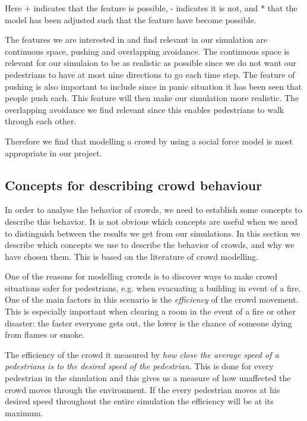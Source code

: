 Here + indicates that the feature is possible, - indicates it is not, and * that 
the model has been adjusted such that the feature have become possible. \cite{Comparison}

The features we are interested in and find relevant in our simulation are 
continuous space, pushing and overlapping avoidance. The continuous space is 
relevant for our simulaion to be as realistic as possible since we do not want 
our pedestrians to have at most nine directions to go each time step.
The feature of pushing is also important to include since in panic situation it 
has been seen that people push each. This feature will then make our simulation 
more realistic. The overlapping avoidance we find relevant since this enables 
pedestrians to walk through each other.

Therefore we find that modelling a crowd by using a social force model is most 
appropriate in our project. 


\subsection{Concepts for describing crowd behaviour}\label{concepts}
In order to analyse the behavior of crowds, we need to establish some 
concepts to describe this behavior. It is not obvious which concepts  are 
useful when we need to distinguish between the results we get from our 
simulations. In this section we describe which concepts we use to describe the 
behavior of crowds, and why we have chosen them. This is based on the 
literature of crowd modelling.


One of the reasons for modelling crowds is to discover ways to make crowd 
situations safer for pedestrians, e.g. when evacuating a building in event of 
a fire. One of the main factors in this scenario is the \emph{efficiency} of 
the crowd movement. This is especially important when clearing a room in the 
event of a fire or other disaster: the faster everyone gets out, the lower is 
the chance of someone dying from flames or smoke.

The efficiency of the crowd it measured by \emph{how close the average speed 
of a pedestrians is to the desired speed of the pedestrian}. This is done for 
every pedestrian in the simulation and this gives us a measure of how unaffected 
the crowd moves through the environment. If the every pedestrian moves at his 
desired speed throughout the entire simulation the efficiency will be at its 
maximum.

